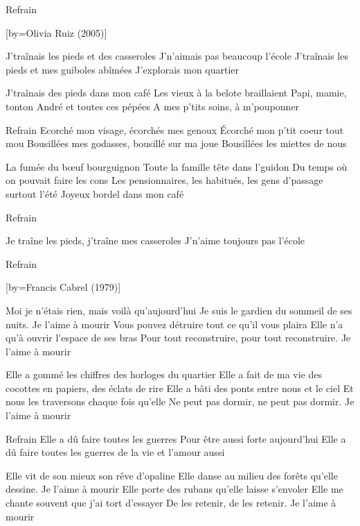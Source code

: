 \beginverse
Refrain\\[5x]
\endverse

[by={Olivia Ruiz (2005)}]

\beginverse
J'traînais les pieds et des casseroles
J'n'aimais pas beaucoup l'école
J'traînais les pieds et mes guiboles abîmées
J'explorais mon quartier
\endverse

\beginverse
J'traînais des pieds dans mon café
Les vieux à la belote braillaient
Papi, mamie, tonton André et toutes ces pépées
A mes p'tits soins, à m'pouponner
\endverse

\beginverse
Refrain
Ecorché mon visage, écorchés mes genoux
Écorché mon p'tit coeur tout mou
Bousillées mes godasses, bousillé sur ma joue
Bousillées les miettes de nous
\endverse

\beginverse
La fumée du bœuf bourguignon
Toute la famille tête dans l'guidon
Du temps où on pouvait faire les cons
Les pensionnaires, les habitués, les gens d'passage surtout l'été
Joyeux bordel dans mon café
\endverse

\beginverse
Refrain
\endverse

\beginverse
Je traîne les pieds, j'traîne mes casseroles
J'n'aime toujours pas l'école
\endverse

\beginverse
Refrain
\endverse

[by={Francis Cabrel (1979)}]

\beginverse
Moi je n'étais rien, mais voilà qu'aujourd'hui
Je suis le gardien du sommeil de ses nuits. Je l'aime à mourir
Vous pouvez détruire tout ce qu'il vous plaira
Elle n'a qu'à ouvrir l'espace de ses bras
Pour tout reconstruire, pour tout reconstruire. Je l'aime à mourir
\endverse

\beginverse
Elle a gommé les chiffres des horloges du quartier
Elle a fait de ma vie des cocottes en papiers, des éclats de rire
Elle a bâti des ponts entre nous et le ciel
Et nous les traversons chaque fois qu'elle
Ne peut pas dormir, ne peut pas dormir. Je l'aime à mourir
\endverse

\beginverse
Refrain
Elle a dû faire toutes les guerres
Pour être aussi forte aujourd'hui
Elle a dû faire toutes les guerres de la vie et l'amour aussi
\endverse

\beginverse
Elle vit de son mieux son rêve d'opaline
Elle danse au milieu des forêts qu'elle dessine. Je l'aime à mourir
Elle porte des rubans qu'elle laisse s'envoler
Elle me chante souvent que j'ai tort d'essayer
De les retenir, de les retenir. Je l'aime à mourir
\endverse

